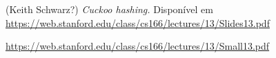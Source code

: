 \begin{thebibliography}{9}
	 (Keith Schwarz?) \emph{Cuckoo hashing.} Disponível em \url{https://web.stanford.edu/class/cs166/lectures/13/Slides13.pdf}
	
	 \url{https://web.stanford.edu/class/cs166/lectures/13/Small13.pdf}
	
\end{thebibliography}


